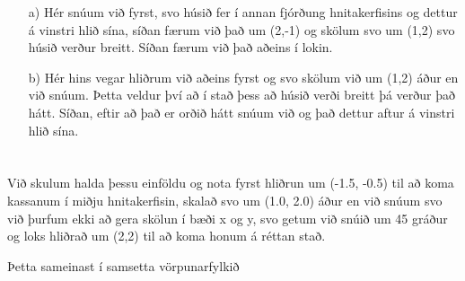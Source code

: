 \documentclass{article}
\begin{document}
		\begin{itemize}
			\item[a)]
				Hér snúum við fyrst, svo húsið fer í annan fjórðung 
				hnitakerfisins og dettur á vinstri hlið sína, síðan færum 
				við það um (2,-1) og skölum svo um (1,2) svo húsið verður 
				breitt. Síðan færum við það aðeins í lokin.
				\begin{center}
	\end{center}
			\item[b)]
				Hér hins vegar hliðrum við aðeins fyrst og svo skölum við 
				um (1,2) áður en við snúum. Þetta veldur því að í stað þess 
				að húsið verði breitt þá verður það hátt. Síðan, eftir að 
				það er orðið hátt snúum við og það dettur aftur á vinstri 
				hlið sína.
		\begin{center}
	\end{center}
		\end{itemize}

		\section{}

		Við skulum halda þessu einföldu og nota fyrst hliðrun um 
		(-1.5, -0.5) til að koma kassanum í miðju hnitakerfisin, skalað 
		svo um (1.0, 2.0) áður en við snúum svo við þurfum ekki að gera 
		skölun í bæði x og y, svo getum við snúið um 45 gráður og loks hliðrað 
		um (2,2) til að koma honum á réttan stað.

		Þetta sameinast í samsetta vörpunarfylkið
\end{document}
